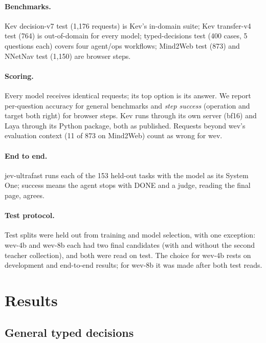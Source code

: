 \documentclass[11pt]{article}
\begin{document}
\paragraph{Benchmarks.} Kev decision-v7 test (1{,}176 requests) is Kev's in-domain suite; Kev transfer-v4 test (764)
is out-of-domain for every model; typed-decisions test (400 cases, 5 questions each) covers four agent/ops workflows;
Mind2Web test (873) and NNetNav test (1{,}150) are browser steps.

\paragraph{Scoring.} Every model receives identical requests; its top option is its answer. We report per-question
accuracy for general benchmarks and \emph{step success} (operation and target both right) for browser steps. Kev runs
through its own server (bf16) and Laya through its Python package, both as published. Requests beyond wev's evaluation
context (11 of 873 on Mind2Web) count as wrong for wev.

\paragraph{End to end.} jev-ultrafast runs each of the 153 held-out tasks with the model as its System One; success
means the agent stops with DONE and a judge, reading the final page, agrees.

\paragraph{Test protocol.} Test splits were held out from training and model selection, with one exception: wev-4b
and wev-8b each had two final candidates (with and without the second teacher collection), and both were read on
test. The choice for wev-4b rests on development and end-to-end results; for wev-8b it was made after both test reads.

\section{Results}
\label{sec:results}

\subsection{General typed decisions}
\end{document}
